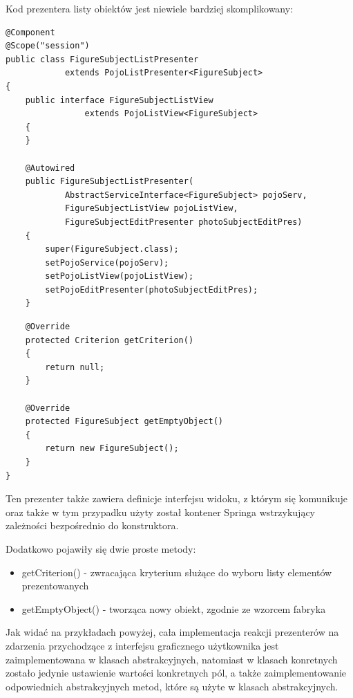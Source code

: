 Kod prezentera listy obiektów jest niewiele bardziej skomplikowany:
\begin{lstlisting}
@Component
@Scope("session")
public class FigureSubjectListPresenter 
			extends PojoListPresenter<FigureSubject>
{
	public interface FigureSubjectListView 
				extends PojoListView<FigureSubject>
	{
	}

	@Autowired
	public FigureSubjectListPresenter(
			AbstractServiceInterface<FigureSubject> pojoServ, 
			FigureSubjectListView pojoListView,
			FigureSubjectEditPresenter photoSubjectEditPres)
	{
		super(FigureSubject.class);
		setPojoService(pojoServ);
		setPojoListView(pojoListView);
		setPojoEditPresenter(photoSubjectEditPres);
	}
\end{lstlisting}
\newpage
\begin{lstlisting}
	@Override
	protected Criterion getCriterion()
	{
		return null;
	}

	@Override
	protected FigureSubject getEmptyObject()
	{
		return new FigureSubject();
	}
}
\end{lstlisting}
Ten prezenter także zawiera definicje interfejsu widoku, z którym się komunikuje oraz także w tym przypadku użyty został kontener Springa wstrzykujący zależności bezpośrednio do konstruktora.

Dodatkowo pojawiły się dwie proste metody:
\begin{itemize}
\item getCriterion() - zwracająca kryterium służące do wyboru listy elementów prezentowanych
\item getEmptyObject() - tworząca nowy obiekt, zgodnie ze wzorcem fabryka
\end{itemize}

Jak widać na przykładach powyżej, cała implementacja reakcji prezenterów na zdarzenia przychodzące z interfejsu graficznego użytkownika jest zaimplementowana w klasach abstrakcyjnych, natomiast w klasach konretnych zostało jedynie ustawienie wartości konkretnych pól, a także zaimplementowanie odpowiednich abstrakcyjnych metod, które są użyte w klasach abstrakcyjnych.
